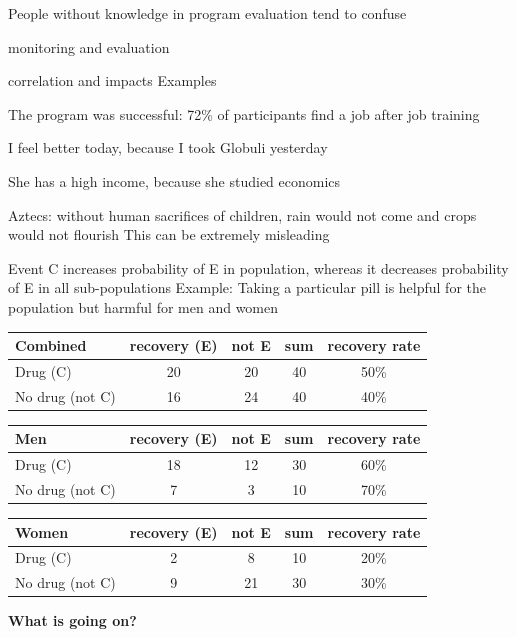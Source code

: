 \documentclass[
  25pt,         %
  a4paper,
  landscape,
  Screen4to3,
  footrule ]{foils}
\renewcommand{\pause}{}
\newcommand{\xx}{\item[{\small $\bullet$}]}
\begin{document}
\begin{small}
\bi 
	\x People without knowledge in program evaluation tend to confuse 
	\bi 
		\xx monitoring and evaluation
		\xx correlation and impacts
	\ei
	\x Examples
	\bi 
		\xx The program was successful: 72\% of participants find a job after job training
		\xx I feel better today, because I took Globuli yesterday
		\xx She has a high income, because she studied economics
		\xx Aztecs: without human sacrifices of children, rain would not come and crops would not flourish
	\ei
	\x This can be extremely misleading
\ei
\end{small}


\bi 
\x Event C increases probability of E in population, whereas it decreases probability of E in all sub-populations
\x Example: Taking a particular pill is helpful for the population but harmful for men and women
\ei
\pause
\begin{tabular}{lcccc}\hline 
Combined&recovery (E)&not E & sum & recovery rate \\\hline 
Drug (C)&20&20&40&50\%\\
No drug (not C)&16&24&40&40\%\\\hline 
  \end{tabular}


\begin{tabular}{lcccc}\hline 
Men&recovery (E)&not E & sum & recovery rate \\\hline 
Drug (C)&18&12&30&60\%\\
No drug (not C)&7&3&10&70\%\\\hline 
  \end{tabular}

\begin{tabular}{lcccc}\hline 
Women&recovery (E)&not E & sum & recovery rate \\\hline 
Drug (C)&2&8&10&20\%\\
No drug (not C)&9&21&30&30\%\\\hline 
  \end{tabular}
\vspace{1cm}

\textbf{What is going on?}


\end{document}
